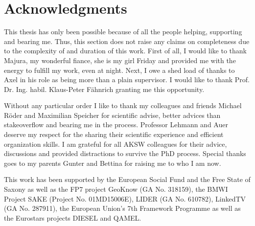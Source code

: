 



\bigskip

\begingroup
\let\clearpage\relax
\let\cleardoublepage\relax
\let\cleardoublepage\relax
\chapter*{Acknowledgments}
This thesis has only been possible because of all the people helping, supporting and bearing me.
Thus, this section does not raise any claims on completeness due to the complexity of and duration of this work.
First of all, I would like to thank Majura, my wonderful fiance, she is my girl Friday and provided me with the energy to fulfill my work, even at night.
Next, I owe a shed load of thanks to Axel in his role as being more than a plain supervisor. 
I would like to thank Prof. Dr. Ing. habil. Klaus-Peter F\"ahnrich granting me this opportunity.

Without any particular order I like to thank my colleagues and friends Michael Röder and Maximilian Speicher for scientific advise, better advices than stakeoverflow and bearing me in the process. 
Professor Lehmann and Auer deserve my respect for the sharing their scientific experience and efficient organization skills. 
I am grateful for all AKSW colleagues for their advice, discussions and provided distractions to survive the PhD process. 
Special thanks goes to my parents Gunter and Bettina for raising me to who I am now. 


\bigskip


This work has been supported by the European Social Fund and the Free State of Saxony as well as the FP7 project GeoKnow (GA No. 318159), the BMWI Project SAKE (Project No. 01MD15006E), LIDER (GA No. 610782), LinkedTV (GA No. 287911), the European Union's 7th Framework Programme as well as the Eurostars projects DIESEL and QAMEL.


\endgroup



